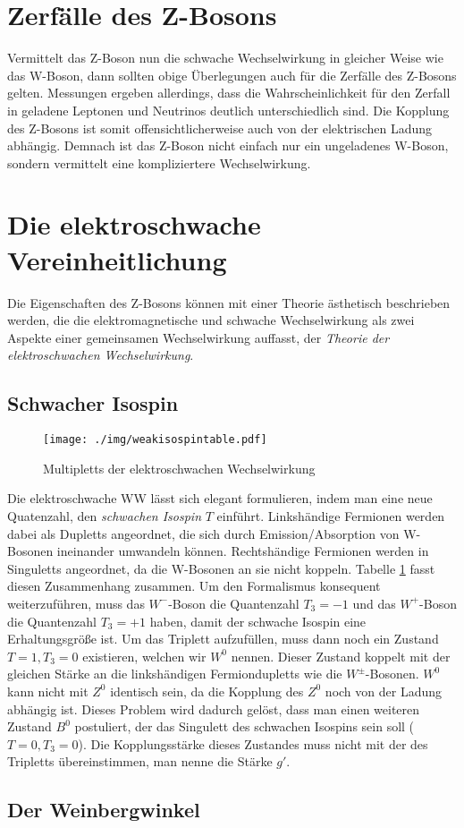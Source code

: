 \section{Zerfälle des Z-Bosons}
Vermittelt das Z-Boson nun die schwache Wechselwirkung in gleicher Weise wie das W-Boson,
dann sollten obige Überlegungen auch für die Zerfälle des Z-Bosons gelten.
Messungen ergeben allerdings, dass die Wahrscheinlichkeit für den Zerfall in geladene Leptonen und Neutrinos deutlich unterschiedlich sind.
Die Kopplung des Z-Bosons ist somit offensichtlicherweise auch von der elektrischen Ladung abhängig.
Demnach ist das Z-Boson nicht einfach nur ein ungeladenes W-Boson, sondern vermittelt eine kompliziertere Wechselwirkung.

\section{Die elektroschwache Vereinheitlichung}
Die Eigenschaften des Z-Bosons können mit einer Theorie ästhetisch beschrieben werden,
die die elektromagnetische und schwache Wechselwirkung als zwei Aspekte einer gemeinsamen Wechselwirkung auffasst, der \textit{Theorie der elektroschwachen Wechselwirkung}.

\subsection{Schwacher Isospin}
\begin{figure}
	\centering
	\texttt{[image: ./img/weakisospintable.pdf]}
	\caption{Multipletts der elektroschwachen Wechselwirkung}
	\label{fig:weakisospin}
\end{figure}
Die elektroschwache WW lässt sich elegant formulieren, indem man eine neue Quatenzahl, den \textit{schwachen Isospin} $T$ einführt.
Linkshändige Fermionen werden dabei als Dupletts angeordnet, die sich durch Emission/Absorption von W-Bosonen ineinander umwandeln können.
Rechtshändige Fermionen werden in Singuletts angeordnet, da die W-Bosonen an sie nicht koppeln.
Tabelle \ref{fig:weakisospin} fasst diesen Zusammenhang zusammen.
Um den Formalismus konsequent weiterzuführen, muss das $W^-$-Boson die Quantenzahl $T_3=-1$ und das $W^+$-Boson die Quantenzahl $T_3=+1$ haben, damit der schwache Isospin eine Erhaltungsgröße ist.
Um das Triplett aufzufüllen, muss dann noch ein Zustand $T=1, T_3=0$ existieren, welchen wir $W^0$ nennen.
Dieser Zustand koppelt mit der gleichen Stärke an die linkshändigen Fermiondupletts wie die $W^\pm$-Bosonen.
$W^0$ kann nicht mit $Z^0$ identisch sein, da die Kopplung des $Z^0$ noch von der Ladung abhängig ist.
Dieses Problem wird dadurch gelöst, dass man einen weiteren Zustand $B^0$ postuliert, der das Singulett des schwachen Isospins sein soll ($T=0, T_3=0$).
Die Kopplungsstärke dieses Zustandes muss nicht mit der des Tripletts übereinstimmen, man nenne die Stärke $g'$.

\subsection{Der Weinbergwinkel}
